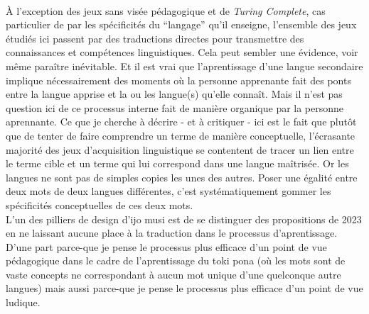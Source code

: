 \documentclass{scrartcl}
\let\emph\relax %
\begin{document}
		\emph{Hégémonie de la traduction}\\
		À l'exception des jeux sans visée pédagogique et de \textit{Turing Complete}, cas particulier de par les spécificités du “langage” qu'il enseigne, l'ensemble des jeux étudiés ici passent par des traductions directes pour transmettre des connaissances et compétences linguistiques. Cela peut sembler une évidence, voir même paraître inévitable. Et il est vrai que l'aprentissage d'une langue secondaire implique nécessairement des moments où la personne apprenante fait des ponts entre la langue apprise et la ou les langue(s) qu'elle connaît. Mais il n'est pas question ici de ce processus interne fait de manière organique par la personne aprennante. Ce que je cherche à décrire - et à critiquer - ici est le fait que plutôt que de tenter de faire comprendre un terme de manière conceptuelle, l'écrasante majorité des jeux d'acquisition linguistique se contentent de tracer un lien entre le terme cible et un terme qui lui correspond dans une langue maîtrisée. Or les langues ne sont pas de simples copies les unes des autres. Poser une égalité entre deux mots de deux langues différentes, c'est systématiquement gommer les spécificités conceptuelles de ces deux mots.\\
		
		L'un des pilliers de design d'ijo musi est de se distinguer des propositions de 2023 en ne laissant aucune place à la traduction dans le processus d'aprentissage. D'une part parce-que je pense le processus plus efficace d'un point de vue pédagogique dans le cadre de l'aprentissage du toki pona (où les mots sont de vaste concepts ne correspondant à aucun mot unique d'une quelconque autre langues) mais aussi parce-que je pense le processus plus efficace d'un point de vue ludique.\\
		
\end{document}

